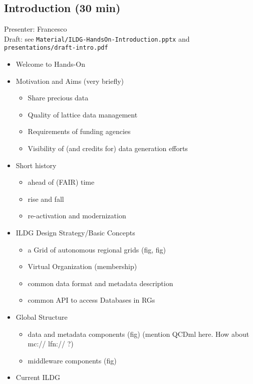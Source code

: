 \documentclass{article}
\begin{document}
\subsection{Introduction (30 min)}
Presenter: Francesco\\
Draft: see {\tt Material/ILDG-HandsOn-Introduction.pptx} and {\tt presentations/draft-intro.pdf}
\begin{itemize}
    \item Welcome to Hands-On
    \item Motivation and Aims (very briefly)
    \begin{itemize}
        \item Share precious data
        \item Quality of lattice data management
        \item Requirements of funding agencies
        \item Visibility of (and credits for) data generation efforts
    \end{itemize}
        \item Short history 
    \begin{itemize}
        \item ahead of (FAIR) time
        \item rise and fall
        \item re-activation and modernization    
    \end{itemize}
        \item ILDG Design Strategy/Basic Concepts \cite{Karsch:2022tqw}
        \begin{itemize}
            \item a Grid of autonomous regional grids (fig, fig)
            \item Virtual Organization (membership)
            \item common data format and metadata description
            \item common API to access Databases in RGs
        \end{itemize}
        \item Global Structure \cite{Karsch:2022tqw}
        \begin{itemize}
            \item data and metadata components (fig) (mention QCDml here. How about mc:// lfn:// ?)
            \item middleware components (fig)
        \end{itemize}
        \item Current ILDG \cite{Karsch:2022tqw}

\end{itemize}
\end{document}
